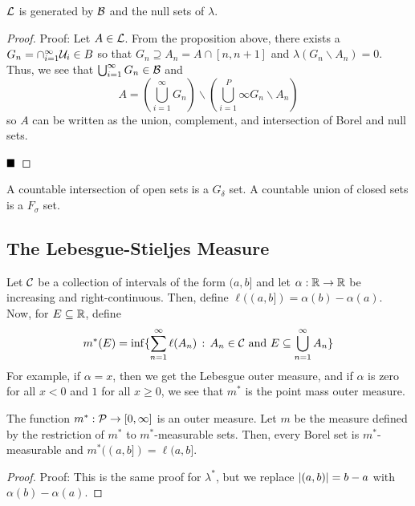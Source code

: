 \begin{lemma}
    $\cal{L}$ is generated by $\cal{B}$ and the null sets of $\lambda$. 
\end{lemma}
\begin{proof}{Proof:}
    Let $A \in \cal{L}$. From the proposition above, there exists a $G_n = \cap_{i = 1}^{\infty} \cal{U}_i \in B$ so that $G_n \supseteq A_n = A \cap [n, n + 1]$ and $\lambda(G_n \backslash A_n) = 0$. Thus, we see that $\bigcup_{i = 1}^{\infty} G_n \in \cal{B}$ and
    \[ A = \left(\bigcup_{i = 1}^{\infty} G_n\right) \backslash \left(\bigcup_{i = 1}^P{\infty} G_n \backslash A_n\right) \]
    so $A$ can be written as the union, complement, and intersection of Borel and null sets. 

    $\qed$
\end{proof}

\begin{definition}
    A countable intersection of open sets is a $G_{\delta}$ set. A countable union of closed sets is a $F_{\sigma}$ set. 
\end{definition}

\subsection*{The Lebesgue-Stieljes Measure}

Let $\cal{C}$ be a collection of intervals of the form $(a, b]$ and let $\alpha : \R \to \R$ be increasing and right-continuous. Then, define $\ell((a, b]) = \alpha(b) - \alpha(a)$. Now, for $E \subseteq \R$, define
\[ m^{*}(E) = \inf\{\sum_{n = 1}^{\infty} \ell(A_n) \col A_n \in \cal{C} \text{ and } E \subseteq \bigcup_{n = 1}^{\infty} A_n\} \]
For example, if $\alpha = x$, then we get the Lebesgue outer measure, and if $\alpha$ is zero for all $x < 0$ and $1$ for all $x \geq 0$, we see that $m^{*}$ is the point mass outer measure. 

\begin{lemma}
    The function $m^{*} : \cal{P} \to [0, \infty]$ is an outer measure. Let $m$ be the measure defined by the restriction of $m^{*}$ to $m^{*}$-measurable sets. Then, every Borel set is $m^{*}$-measurable and $m^{*}((a, b]) = \ell(a, b]$. 
\end{lemma}
\begin{proof}{Proof:}
    This is the same proof for $\lambda^{*}$, but we replace $\abs{(a, b)} = b - a$ with $\alpha(b) - \alpha(a)$. 
\end{proof}